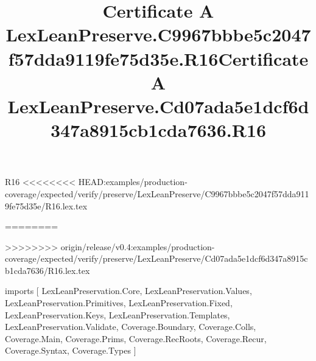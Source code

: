 \begin{lexlean}{R16}
<<<<<<<< HEAD:examples/production-coverage/expected/verify/preserve/LexLeanPreserve/C9967bbbe5c2047f57dda9119fe75d35e/R16.lex.tex
\title{Certificate A LexLeanPreserve.C9967bbbe5c2047f57dda9119fe75d35e.R16}
========
\title{Certificate A LexLeanPreserve.Cd07ada5e1dcf6d347a8915cb1cda7636.R16}
>>>>>>>> origin/release/v0.4:examples/production-coverage/expected/verify/preserve/LexLeanPreserve/Cd07ada5e1dcf6d347a8915cb1cda7636/R16.lex.tex
\begin{coremodule}
imports [
  LexLeanPreservation.Core,
  LexLeanPreservation.Values,
  LexLeanPreservation.Primitives,
  LexLeanPreservation.Fixed,
  LexLeanPreservation.Keys,
  LexLeanPreservation.Templates,
  LexLeanPreservation.Validate,
  Coverage.Boundary,
  Coverage.Colls,
  Coverage.Main,
  Coverage.Prims,
  Coverage.RecRoots,
  Coverage.Recur,
  Coverage.Syntax,
  Coverage.Types
]


\end{coremodule}
\end{lexlean}
